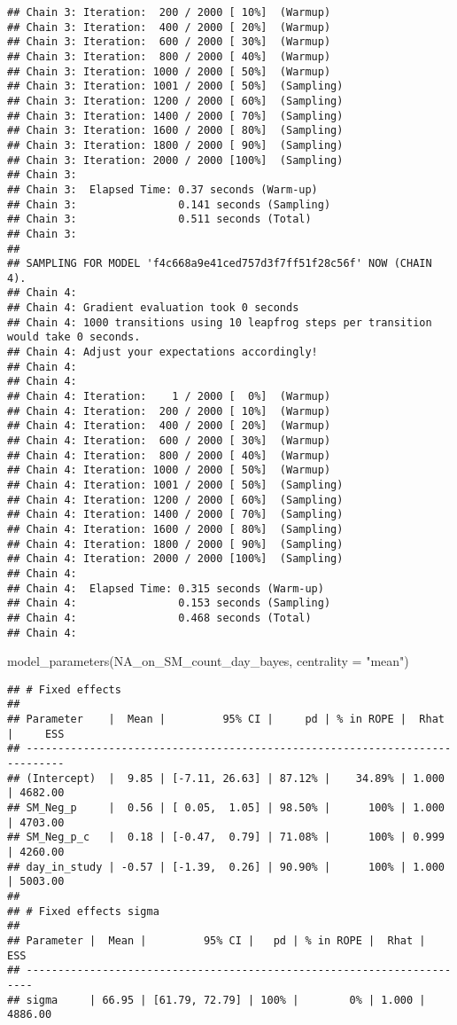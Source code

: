 \documentclass[
]{article}
\newenvironment{Shaded}{\begin{snugshade}}{\end{snugshade}}
\newcommand{\AttributeTok}[1]{\textcolor[rgb]{0.77,0.63,0.00}{#1}}
\newcommand{\FunctionTok}[1]{\textcolor[rgb]{0.00,0.00,0.00}{#1}}
\newcommand{\NormalTok}[1]{#1}
\newcommand{\StringTok}[1]{\textcolor[rgb]{0.31,0.60,0.02}{#1}}
\begin{document}
\begin{verbatim}
## Chain 3: Iteration:  200 / 2000 [ 10%]  (Warmup)
## Chain 3: Iteration:  400 / 2000 [ 20%]  (Warmup)
## Chain 3: Iteration:  600 / 2000 [ 30%]  (Warmup)
## Chain 3: Iteration:  800 / 2000 [ 40%]  (Warmup)
## Chain 3: Iteration: 1000 / 2000 [ 50%]  (Warmup)
## Chain 3: Iteration: 1001 / 2000 [ 50%]  (Sampling)
## Chain 3: Iteration: 1200 / 2000 [ 60%]  (Sampling)
## Chain 3: Iteration: 1400 / 2000 [ 70%]  (Sampling)
## Chain 3: Iteration: 1600 / 2000 [ 80%]  (Sampling)
## Chain 3: Iteration: 1800 / 2000 [ 90%]  (Sampling)
## Chain 3: Iteration: 2000 / 2000 [100%]  (Sampling)
## Chain 3: 
## Chain 3:  Elapsed Time: 0.37 seconds (Warm-up)
## Chain 3:                0.141 seconds (Sampling)
## Chain 3:                0.511 seconds (Total)
## Chain 3: 
## 
## SAMPLING FOR MODEL 'f4c668a9e41ced757d3f7ff51f28c56f' NOW (CHAIN 4).
## Chain 4: 
## Chain 4: Gradient evaluation took 0 seconds
## Chain 4: 1000 transitions using 10 leapfrog steps per transition would take 0 seconds.
## Chain 4: Adjust your expectations accordingly!
## Chain 4: 
## Chain 4: 
## Chain 4: Iteration:    1 / 2000 [  0%]  (Warmup)
## Chain 4: Iteration:  200 / 2000 [ 10%]  (Warmup)
## Chain 4: Iteration:  400 / 2000 [ 20%]  (Warmup)
## Chain 4: Iteration:  600 / 2000 [ 30%]  (Warmup)
## Chain 4: Iteration:  800 / 2000 [ 40%]  (Warmup)
## Chain 4: Iteration: 1000 / 2000 [ 50%]  (Warmup)
## Chain 4: Iteration: 1001 / 2000 [ 50%]  (Sampling)
## Chain 4: Iteration: 1200 / 2000 [ 60%]  (Sampling)
## Chain 4: Iteration: 1400 / 2000 [ 70%]  (Sampling)
## Chain 4: Iteration: 1600 / 2000 [ 80%]  (Sampling)
## Chain 4: Iteration: 1800 / 2000 [ 90%]  (Sampling)
## Chain 4: Iteration: 2000 / 2000 [100%]  (Sampling)
## Chain 4: 
## Chain 4:  Elapsed Time: 0.315 seconds (Warm-up)
## Chain 4:                0.153 seconds (Sampling)
## Chain 4:                0.468 seconds (Total)
## Chain 4:
\end{verbatim}

\begin{Shaded}
\begin{Highlighting}[]
\FunctionTok{model\_parameters}\NormalTok{(NA\_on\_SM\_count\_day\_bayes, }\AttributeTok{centrality =} \StringTok{"mean"}\NormalTok{)}
\end{Highlighting}
\end{Shaded}

\begin{verbatim}
## # Fixed effects
## 
## Parameter    |  Mean |         95% CI |     pd | % in ROPE |  Rhat |     ESS
## ----------------------------------------------------------------------------
## (Intercept)  |  9.85 | [-7.11, 26.63] | 87.12% |    34.89% | 1.000 | 4682.00
## SM_Neg_p     |  0.56 | [ 0.05,  1.05] | 98.50% |      100% | 1.000 | 4703.00
## SM_Neg_p_c   |  0.18 | [-0.47,  0.79] | 71.08% |      100% | 0.999 | 4260.00
## day_in_study | -0.57 | [-1.39,  0.26] | 90.90% |      100% | 1.000 | 5003.00
## 
## # Fixed effects sigma
## 
## Parameter |  Mean |         95% CI |   pd | % in ROPE |  Rhat |     ESS
## -----------------------------------------------------------------------
## sigma     | 66.95 | [61.79, 72.79] | 100% |        0% | 1.000 | 4886.00
\end{verbatim}
\end{document}
